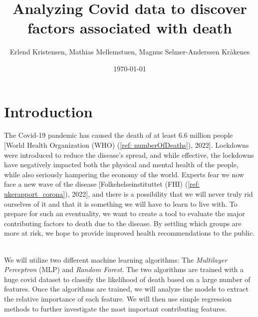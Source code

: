 \documentclass[english,notitlepage,reprint,nofootinbib]{revtex4-1}  %
\begin{document}
\title{Analyzing Covid data to discover factors associated with death}  %
\author{Erlend Kristensen, Mathias Mellemstuen, Magnus Selmer-Anderssen Kråkenes} %
\date{\today}      


\noaffiliation                            %

\begin{abstract}
    
\end{abstract}
\maketitle



\section{Introduction}
\label{sec:INTRODUCTION}
The Covid-19 pandemic has caused the death of at least 6.6 million people [World Health Organization (WHO) (\ref{ref: numberOfDeaths}), 2022]. Lockdowns were introduced to reduce the disease's spread, and while effective, the lockdowns have negatively impacted both the physical and mental health of the people, while also seriously hampering the economy of the world. Experts fear we now face a new wave of the disease [Folkehelseinstituttet (FHI) (\ref{ref: ukerapport_corona}), 2022], and there is a possibility that we will never truly rid ourselves of it and that it is something we will have to learn to live with. 
To prepare for such an eventuality, we want to create a tool to evaluate the major contributing factors to death due to the disease. By settling which groups are more at risk, we hope to provide improved health recommendations to the public. 

\\
 We will utilize two different machine learning algorithms: The \textit{Multilayer Perceptron} (MLP) and \textit{Random Forest}. The two algorithms are trained with a huge covid dataset to classify the likelihood of death based on a large number of features. Once the algorithms are trained, we will analyze the models to extract the relative importance of each feature. We will then use simple regression methods to further investigate the most important contributing features. %
 
\end{document}
